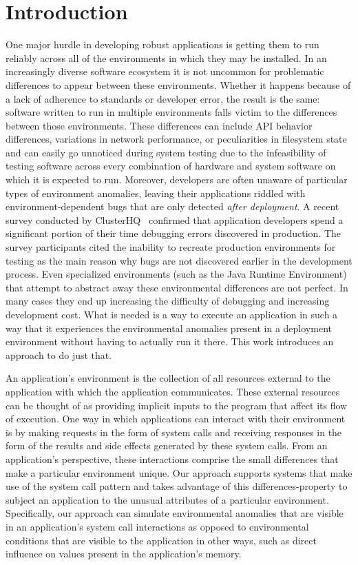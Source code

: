 \section{Introduction}

One major hurdle in developing robust applications is getting them to
run reliably across all of the environments in which they may be
installed.  In an increasingly diverse software ecosystem it is not
uncommon for problematic differences to appear between these
environments.  Whether it happens because of a lack of adherence to
standards or developer error, the result is the same: software written
to run in multiple environments falls victim to the differences
between those environments.  These differences can include API behavior
differences, variations in network performance, or peculiarities in
filesystem state and
can easily go unnoticed
during system testing due to the infeasibility of testing software
across every combination of hardware and system software on which it
is expected to run. Moreover, developers are often unaware
of particular types of environment anomalies, leaving their
applications riddled with environment-dependent bugs that are only
detected \emph{after deployment}. A recent survey conducted by
ClusterHQ~\cite{ClusterHQSurvey} confirmed that application developers
spend a significant portion of their time debugging errors discovered
in production.  The survey participants cited the inability to
recreate production environments for testing as the main reason why
bugs are not discovered earlier in the development process.
Even specialized environments (such as the Java Runtime Environment) that
attempt to abstract away these environmental differences are not perfect.
In many cases they end up increasing the difficulty of debugging and
increasing development cost.
What is needed is a way to execute an application in such a way that
it experiences the environmental anomalies present in a deployment
environment without having to actually run it there.  This work
introduces an approach to do just that.

An application's environment is the collection of all resources
external to the application with which the application communicates.
These external resources can be thought of as providing implicit
inputs to the program that affect its flow of execution.
One way in which applications can interact with their environment is by
making requests in the form of system calls and receiving responses in the
form of the results and side effects generated by these system calls.  From an
application's perspective, these interactions comprise the small differences
that make a particular environment unique. Our approach supports systems that
make use of the system call pattern and takes advantage of this
differences-property to subject an application to the unusual attributes of a
particular environment.  Specifically, our approach can simulate environmental
anomalies that are visible in an application's system call interactions as
opposed to environmental conditions that are visible to the application in
other ways, such as direct influence on values present in the application's
memory.

